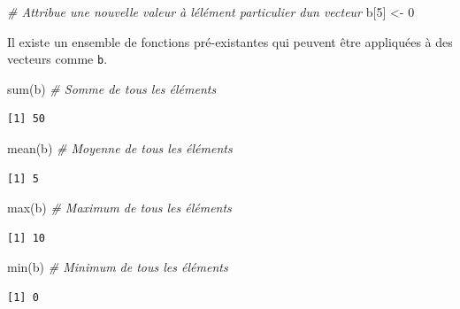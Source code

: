 \documentclass[
  12pt,
]{book}
\newenvironment{Shaded}{\begin{snugshade}}{\end{snugshade}}
\newcommand{\CommentTok}[1]{\textcolor[rgb]{0.56,0.35,0.01}{\textit{#1}}}
\newcommand{\DecValTok}[1]{\textcolor[rgb]{0.00,0.00,0.81}{#1}}
\newcommand{\FunctionTok}[1]{\textcolor[rgb]{0.00,0.00,0.00}{#1}}
\newcommand{\NormalTok}[1]{#1}
\newcommand{\OtherTok}[1]{\textcolor[rgb]{0.56,0.35,0.01}{#1}}
\begin{document}
\begin{Shaded}
\begin{Highlighting}[]
\CommentTok{\# Attribue une nouvelle valeur à l\textquotesingle{}élément particulier d\textquotesingle{}un vecteur}
\NormalTok{b[}\DecValTok{5}\NormalTok{] }\OtherTok{\textless{}{-}} \DecValTok{0}
\end{Highlighting}
\end{Shaded}

Il existe un ensemble de fonctions pré-existantes qui peuvent être appliquées à des vecteurs comme \texttt{b}.

\begin{Shaded}
\begin{Highlighting}[]
\FunctionTok{sum}\NormalTok{(b) }\CommentTok{\# Somme de tous les éléments}
\end{Highlighting}
\end{Shaded}

\begin{verbatim}
[1] 50
\end{verbatim}

\begin{Shaded}
\begin{Highlighting}[]
\FunctionTok{mean}\NormalTok{(b) }\CommentTok{\# Moyenne de tous les éléments}
\end{Highlighting}
\end{Shaded}

\begin{verbatim}
[1] 5
\end{verbatim}

\begin{Shaded}
\begin{Highlighting}[]
\FunctionTok{max}\NormalTok{(b) }\CommentTok{\# Maximum de tous les éléments}
\end{Highlighting}
\end{Shaded}

\begin{verbatim}
[1] 10
\end{verbatim}

\begin{Shaded}
\begin{Highlighting}[]
\FunctionTok{min}\NormalTok{(b) }\CommentTok{\# Minimum de tous les éléments}
\end{Highlighting}
\end{Shaded}

\begin{verbatim}
[1] 0
\end{verbatim}
\end{document}
